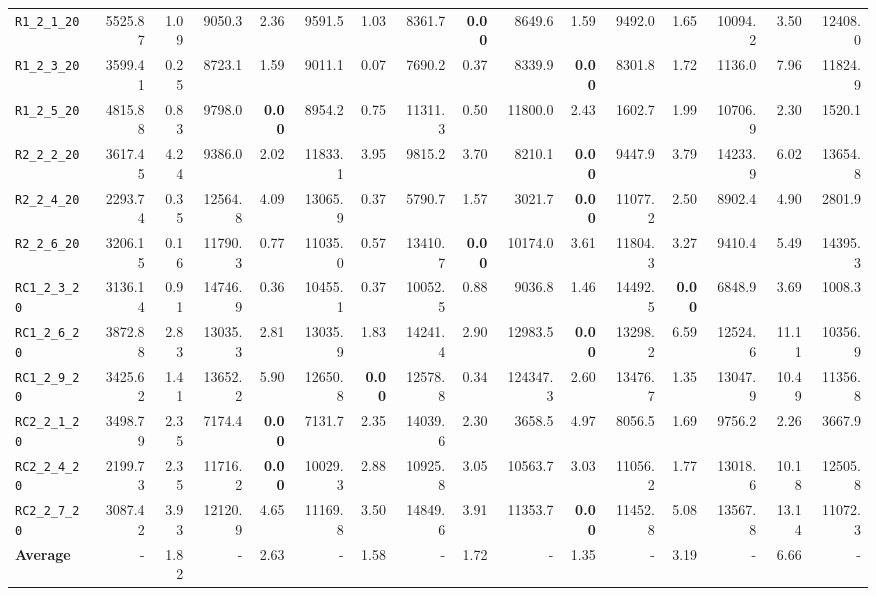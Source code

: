 \begin{table}[ht]
\begin{adjustbox}{width=\textwidth}
\begin{tabular}{l r r r @{\hspace{8pt}} r r @{\hspace{8pt}} r r @{\hspace{8pt}} r r @{\hspace{8pt}} r r @{\hspace{8pt}} r r @{\hspace{8pt}} r r @{\hspace{8pt}}}
\texttt{R1\_2\_1\_20} & 5525.87 & 1.09 & 9050.3 & 2.36 & 9591.5 & 1.03 & 8361.7 & \textbf{0.00} & 8649.6 & 1.59 & 9492.0 & 1.65 & 10094.2 & 3.50 & 12408.0 \\
\texttt{R1\_2\_3\_20} & 3599.41 & 0.25 & 8723.1 & 1.59 & 9011.1 & 0.07 & 7690.2 & 0.37 & 8339.9 & \textbf{0.00} & 8301.8 & 1.72 & 1136.0 & 7.96 & 11824.9 \\
\texttt{R1\_2\_5\_20} & 4815.88 & 0.83 & 9798.0 & \textbf{0.00} & 8954.2 & 0.75 & 11311.3 & 0.50 & 11800.0 & 2.43 & 1602.7 & 1.99 & 10706.9 & 2.30 & 1520.1 \\
\texttt{R2\_2\_2\_20} & 3617.45 & 4.24 & 9386.0 & 2.02 & 11833.1 & 3.95 & 9815.2 & 3.70 & 8210.1 & \textbf{0.00} & 9447.9 & 3.79 & 14233.9 & 6.02 & 13654.8 \\
\texttt{R2\_2\_4\_20} & 2293.74 & 0.35 & 12564.8 & 4.09 & 13065.9 & 0.37 & 5790.7 & 1.57 & 3021.7 & \textbf{0.00} & 11077.2 & 2.50 & 8902.4 & 4.90 & 2801.9 \\
\texttt{R2\_2\_6\_20} & 3206.15 & 0.16 & 11790.3 & 0.77 & 11035.0 & 0.57 & 13410.7 & \textbf{0.00} & 10174.0 & 3.61 & 11804.3 & 3.27 & 9410.4 & 5.49 & 14395.3 \\
\texttt{RC1\_2\_3\_20} & 3136.14 & 0.91 & 14746.9 & 0.36 & 10455.1 & 0.37 & 10052.5 & 0.88 & 9036.8 & 1.46 & 14492.5 & \textbf{0.00} & 6848.9 & 3.69 & 1008.3 \\
\texttt{RC1\_2\_6\_20} & 3872.88 & 2.83 & 13035.3 & 2.81 & 13035.9 & 1.83 & 14241.4 & 2.90 & 12983.5 & \textbf{0.00} & 13298.2 & 6.59 & 12524.6 & 11.11 & 10356.9 \\
\texttt{RC1\_2\_9\_20} & 3425.62 & 1.41 & 13652.2 & 5.90 & 12650.8 & \textbf{0.00} & 12578.8 & 0.34 & 124347.3 & 2.60 & 13476.7 & 1.35 & 13047.9 & 10.49 & 11356.8 \\
\texttt{RC2\_2\_1\_20} & 3498.79 & 2.35 & 7174.4 & \textbf{0.00} & 7131.7 & 2.35 & 14039.6 & 2.30 & 3658.5 & 4.97 & 8056.5 & 1.69 & 9756.2 & 2.26 & 3667.9 \\
\texttt{RC2\_2\_4\_20} & 2199.73 & 2.35 & 11716.2 & \textbf{0.00} & 10029.3 & 2.88 & 10925.8 & 3.05 & 10563.7 & 3.03 & 11056.2 & 1.77 & 13018.6 & 10.18 & 12505.8 \\
\texttt{RC2\_2\_7\_20} & 3087.42 & 3.93 & 12120.9 & 4.65 & 11169.8 & 3.50 & 14849.6 & 3.91 & 11353.7 & \textbf{0.00} & 11452.8 & 5.08 & 13567.8 & 13.14 & 11072.3 \\
\midrule
\textbf{Average} & - & 1.82 & - & 2.63 & - & 1.58 & - & 1.72 & - & 1.35 & - & 3.19 & - & 6.66 & - \\
\bottomrule
\end{tabular}
\end{adjustbox}
\end{table}